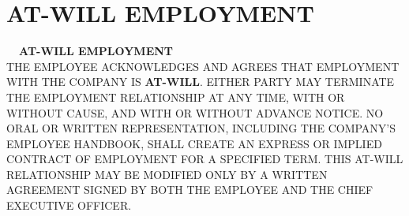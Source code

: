 \section{AT-WILL EMPLOYMENT}

\begin{atwillbox}
  \centering
  {\large\bfseries\color{accent}\faExclamationTriangle\ \ AT-WILL EMPLOYMENT}\\[7pt]
  {\small\color{dark}
  THE EMPLOYEE ACKNOWLEDGES AND AGREES THAT EMPLOYMENT WITH THE COMPANY IS \textbf{AT-WILL}. EITHER PARTY MAY TERMINATE THE EMPLOYMENT RELATIONSHIP AT ANY TIME, WITH OR WITHOUT CAUSE, AND WITH OR WITHOUT ADVANCE NOTICE. NO ORAL OR WRITTEN REPRESENTATION, INCLUDING THE COMPANY'S EMPLOYEE HANDBOOK, SHALL CREATE AN EXPRESS OR IMPLIED CONTRACT OF EMPLOYMENT FOR A SPECIFIED TERM. THIS AT-WILL RELATIONSHIP MAY BE MODIFIED ONLY BY A WRITTEN AGREEMENT SIGNED BY BOTH THE EMPLOYEE AND THE CHIEF EXECUTIVE OFFICER.
  }
\end{atwillbox}

